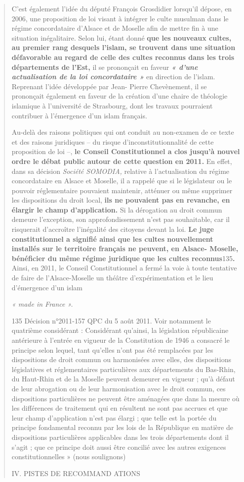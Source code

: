 \begin{quote}
C'est également l'idée du député François Grosdidier lorsqu'il dépose,
en 2006, une proposition de loi visant à intégrer le culte musulman dans
le régime concordataire d'Alsace et de Moselle afin de mettre fin à une
situation inégalitaire. Selon lui, étant donné \textbf{que les nouveaux
cultes, au premier rang desquels l'islam, se trouvent dans une situation
défavorable au regard de celle des cultes reconnus dans les trois
départements de l'Est,} il se prononçait en faveur \emph{\textbf{« d'une
actualisation de la loi concordataire »}} en direction de l'islam.
Reprenant l'idée développée par Jean- Pierre Chevènement, il se
prononçait également en faveur de la création d'une chaire de théologie
islamique à l'université de Strasbourg, dont les travaux pourraient
contribuer à l'émergence d'un islam français.

Au-delà des raisons politiques qui ont conduit au non-examen de ce texte
et des raisons juridiques -- du risque d'inconstitutionnalité de cette
proposition de loi --, \textbf{le Conseil Constitutionnel a clos jusqu'à
nouvel ordre le débat public autour de cette question en 2011.} En
effet, dans sa décision \emph{Société SOMODIA,} relative à
l'actualisation du régime concordataire en Alsace et Moselle, il a
rappelé que si le législateur ou le pouvoir réglementaire pouvaient
maintenir, atténuer ou même supprimer les dispositions du droit local,
\textbf{ils ne pouvaient pas en revanche, en élargir le champ
d'application.} Si la dérogation au droit commun demeure l'exception,
son approfondissement n'est pas souhaitable, car il risquerait
d'accroître l'inégalité des citoyens devant la loi. \textbf{Le juge
constitutionnel a signifié ainsi que les cultes nouvellement installés
sur le territoire français ne peuvent, en Alsace- Moselle, bénéficier du
même régime juridique que les cultes reconnus}135\textbf{.} Ainsi, en
2011, le Conseil Constitutionnel a fermé la voie à toute tentative de
faire de l'Alsace-Moselle un théâtre d'expérimentation et le lieu
d'émergence d'un islam

\emph{« made in France ».}

135 Décision n°2011-157 QPC du 5 août 2011. Voir notamment le quatrième
considérant : Considérant qu'ainsi, la législation républicaine
antérieure à l'entrée en vigueur de la Constitution de 1946 a consacré
le principe selon lequel, tant qu'elles n'ont pas été remplacées par les
dispositions de droit commun ou harmonisées avec elles, des dispositions
législatives et réglementaires particulières aux départements du
Bas-Rhin, du Haut-Rhin et de la Moselle peuvent demeurer en vigueur ;
qu'à défaut de leur abrogation ou de leur harmonisation avec le droit
commun, ces dispositions particulières ne peuvent être aménagées que
dans la mesure où les différences de traitement qui en résultent ne sont
pas accrues et que leur champ d'application n'est pas élargi ; que telle
est la portée du principe fondamental reconnu par les lois de la
République en matière de dispositions particulières applicables dans les
trois départements dont il s'agit ; que ce principe doit aussi être
concilié avec les autres exigences constitutionnelles » (nous
soulignons)

IV. PISTES DE RECOMMAND ATIONS
\end{quote}


